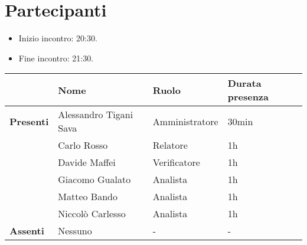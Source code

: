 \section*{Partecipanti}

\begin{itemize}
	\item Inizio incontro: 20:30.
	\item Fine incontro: 21:30.
\end{itemize}


\begin{center}
	{\renewcommand{\arraystretch}{1.5}
		\begin{tabular}{llll}
			                  & \textbf{Nome}          & \textbf{Ruolo} & \textbf{Durata presenza} \\
			\hline
			\textbf{Presenti} & Alessandro Tigani Sava & Amministratore & 30min                    \\
			                  & Carlo Rosso            & Relatore       & 1h                       \\
			                  & Davide Maffei          & Verificatore   & 1h                       \\
			                  & Giacomo Gualato        & Analista       & 1h                       \\
			                  & Matteo Bando           & Analista       & 1h                       \\
			                  & Niccolò Carlesso       & Analista       & 1h                       \\
			\hline
			\textbf{Assenti}  & Nessuno                & -              & -                        \\
		\end{tabular}
	}
\end{center}

